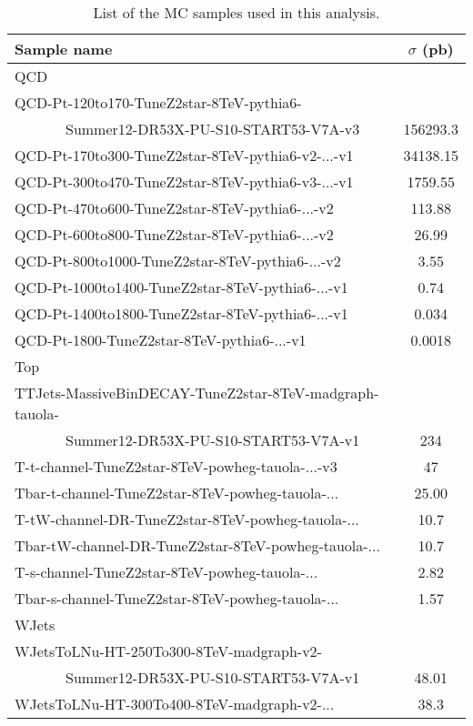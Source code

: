 \begin{table}[!htb]
\begin{center}
\caption{List of the MC samples used in this analysis.}
\label{Tab.MCSamples}
\begin{tabular}{|l|c|}
\hline
Sample name                                                                    & $\sigma$ (pb) \\\hline
QCD &  \\\hline
QCD-Pt-120to170-TuneZ2star-8TeV-pythia6- & \\
~~~~~~~Summer12-DR53X-PU-S10-START53-V7A-v3   & 156293.3\\
QCD-Pt-170to300-TuneZ2star-8TeV-pythia6-v2-...-v1& 34138.15\\
QCD-Pt-300to470-TuneZ2star-8TeV-pythia6-v3-...-v1& 1759.55\\
QCD-Pt-470to600-TuneZ2star-8TeV-pythia6-...-v2   & 113.88 \\
QCD-Pt-600to800-TuneZ2star-8TeV-pythia6-...-v2   & 26.99\\
QCD-Pt-800to1000-TuneZ2star-8TeV-pythia6-...-v2  & 3.55\\
QCD-Pt-1000to1400-TuneZ2star-8TeV-pythia6-...-v1 & 0.74\\
QCD-Pt-1400to1800-TuneZ2star-8TeV-pythia6-...-v1 & 0.034\\
QCD-Pt-1800-TuneZ2star-8TeV-pythia6-...-v1       & 0.0018\\\hline
Top &  \\\hline
TTJets-MassiveBinDECAY-TuneZ2star-8TeV-madgraph-tauola- & \\
~~~~~~~Summer12-DR53X-PU-S10-START53-V7A-v1                & 234\\
T-t-channel-TuneZ2star-8TeV-powheg-tauola-...-v3    &  47\\
Tbar-t-channel-TuneZ2star-8TeV-powheg-tauola-...    & 25.00\\
T-tW-channel-DR-TuneZ2star-8TeV-powheg-tauola-...   & 10.7\\
Tbar-tW-channel-DR-TuneZ2star-8TeV-powheg-tauola-...& 10.7\\
T-s-channel-TuneZ2star-8TeV-powheg-tauola-...       & 2.82\\
Tbar-s-channel-TuneZ2star-8TeV-powheg-tauola-...    & 1.57\\\hline
WJets& \\\hline
WJetsToLNu-HT-250To300-8TeV-madgraph-v2- & \\
~~~~~~~Summer12-DR53X-PU-S10-START53-V7A-v1   & 48.01 \\
WJetsToLNu-HT-300To400-8TeV-madgraph-v2-...                                    & 38.3  \\

\end{tabular}
\end{center}
\end{table}
